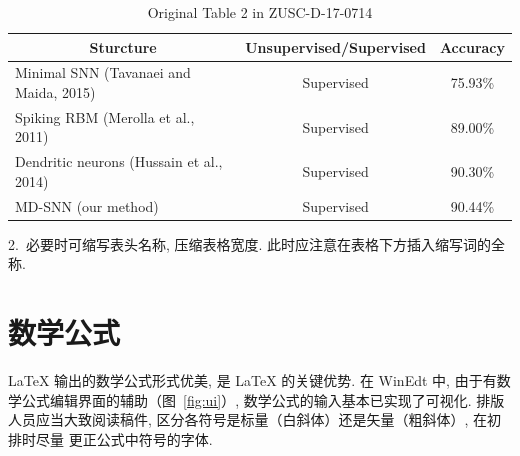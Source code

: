 \documentclass[twoside,twocolumn]{article}
\begin{document}
\begin{CJK}{UTF8}{song}
\begin{table}[thp]
\footnotesize
\centering
\caption{Original Table 2 in ZUSC-D-17-0714}
\label{tab:example2-714}
\addtolength{\tabcolsep}{-2pt}
\begin{tabular*}{13cm}{@{\extracolsep{\fill}}lcc@{}}
\toprule[0.75pt]
\multicolumn{1}{c}{Sturcture} & Unsupervised/Supervised & Accuracy\\
\midrule[0.5pt]
 Minimal SNN (Tavanaei and Maida, 2015)    & Supervised  & 75.93\%  \\
 Spiking RBM (Merolla et al., 2011)        & Supervised  & 89.00\%  \\
 Dendritic neurons (Hussain et al., 2014)  & Supervised  & 90.30\%  \\
 MD-SNN (our method)                       & Supervised  & 90.44\%  \\
\bottomrule[0.75pt]
\end{tabular*}
\end{table}

2.~必要时可缩写表头名称, 压缩表格宽度. 此时应注意在表格下方插入缩写词的全称. 


\section{数学公式}

\LaTeX{} 输出的数学公式形式优美, 是 \LaTeX{} 的关键优势. 
在 WinEdt 中, 由于有数学公式编辑界面的辅助（图~\ref{fig:ui}）, 
数学公式的输入基本已实现了可视化. 排版人员应当大致阅读稿件, 
区分各符号是标量（白斜体）还是矢量（粗斜体）, 在初排时尽量
更正公式中符号的字体. 


\end{CJK}
\end{document}
